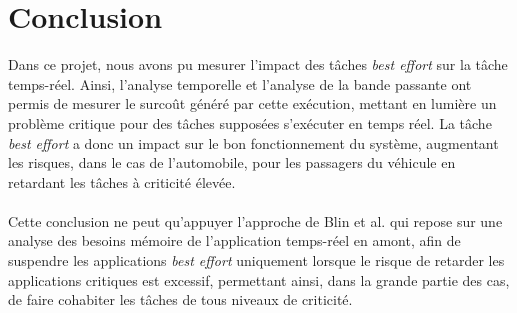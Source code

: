 \section*{Conclusion}
Dans ce projet, nous avons pu mesurer l'impact des tâches \textit{best effort}
sur la tâche temps-réel. Ainsi, l'analyse temporelle et l'analyse de la bande
passante ont permis de mesurer le surcoût généré par cette exécution, mettant
en lumière un problème critique pour des tâches supposées s'exécuter en temps
réel. La tâche \textit{best effort} a donc un impact sur le bon fonctionnement
du système, augmentant les risques, dans le cas de l'automobile, pour les
passagers du véhicule en retardant les tâches à criticité élevée.
\paragraph{}
Cette conclusion ne peut qu'appuyer l'approche de Blin et al.
\cite{blin_protecting_2015} qui repose sur une analyse des besoins mémoire de
l'application temps-réel en amont, afin de suspendre les applications 
\textit{best effort} uniquement lorsque le risque de retarder les applications
critiques est excessif, permettant ainsi, dans la grande partie des cas, de
faire cohabiter les tâches de tous niveaux de criticité.
